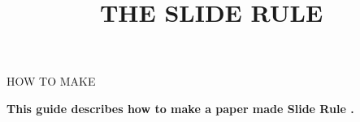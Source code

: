
\newcommand{\makefulltitle}{How To Make The Slide Rule }



\title{\fontsize{60}{60}\selectfont THE SLIDE RULE}
\preauthor{}\postauthor{}\author{}
\predate{}\postdate{}\date{}


  \begin{center}
    \headingfont\fontsize{20}{20}\selectfont HOW TO MAKE
  \end{center}

  {\let\newpage\relax\maketitle}%
  \nosection{}
  \large\textbf{\makeperex This guide describes how to make a paper made Slide Rule \modelname.}

